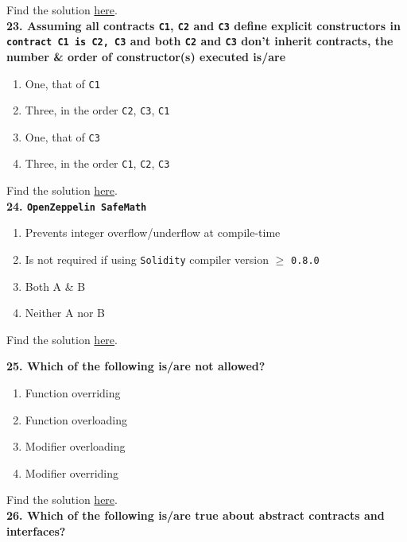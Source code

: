 Find the solution \hyperref[sec:exam3_q22]{here}.\\

\textbf{23. Assuming all contracts \texttt{C1}, \texttt{C2} and \texttt{C3} define explicit constructors in \texttt{contract C1 is C2, C3}  and both \texttt{C2} and \texttt{C3} don't inherit contracts, the number \& order of constructor(s) executed is/are}

\begin{enumerate}[label=\Alph*.]
    \item One, that of \verb|C1|
    \item Three, in the order \verb|C2|, \verb|C3|, \verb|C1|
    \item One, that of \verb|C3|
    \item Three, in the order \verb|C1|, \verb|C2|, \verb|C3|
\end{enumerate}

Find the solution \hyperref[sec:exam3_q23]{here}.\\

\textbf{24. \texttt{OpenZeppelin SafeMath}}

\begin{enumerate}[label=\Alph*.]
    \item Prevents integer overflow/underflow at compile-time
    \item Is not required if using \verb|Solidity| compiler version $\geq$ \verb|0.8.0|
    \item Both A \& B
    \item Neither A nor B
\end{enumerate}

Find the solution \hyperref[sec:exam3_q24]{here}.\\

\pagebreak

\textbf{25. Which of the following is/are not allowed?}

\begin{enumerate}[label=\Alph*.]
    \item Function overriding
    \item Function overloading
    \item Modifier overloading
    \item Modifier overriding
\end{enumerate}

Find the solution \hyperref[sec:exam3_q25]{here}.\\

\textbf{26. Which of the following is/are true about abstract contracts and interfaces?}

